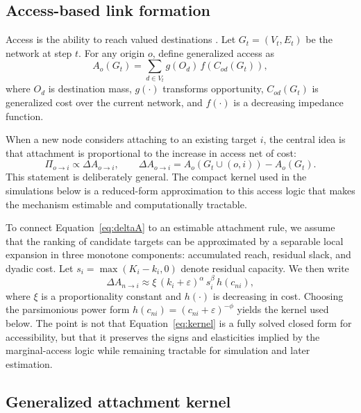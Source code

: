 \documentclass[11pt]{article}
\begin{document}
\subsection{Access-based link formation}

Access is the ability to reach valued destinations \citep{levinson2020towards}. Let $G_t=(V_t,E_t)$ be the network at step $t$. For any origin $o$, define generalized access as
\begin{equation}
A_o(G_t)=\sum_{d\in V_t} g(O_d)\,f(C_{od}(G_t)),
\label{eq:access}
\end{equation}
where $O_d$ is destination mass, $g(\cdot)$ transforms opportunity, $C_{od}(G_t)$ is generalized cost over the current network, and $f(\cdot)$ is a decreasing impedance function.

When a new node considers attaching to an existing target $i$, the central idea is that attachment is proportional to the increase in access net of cost:
\begin{equation}
\Pi_{o\to i} \propto \Delta A_{o\to i},
\qquad
\Delta A_{o\to i}=A_o(G_t\cup (o,i)) - A_o(G_t).
\label{eq:deltaA}
\end{equation}
This statement is deliberately general. The compact kernel used in the simulations below is a reduced-form approximation to this access logic that makes the mechanism estimable and computationally tractable.

To connect Equation~\ref{eq:deltaA} to an estimable attachment rule, we assume that the ranking of candidate targets can be approximated by a separable local expansion in three monotone components: accumulated reach, residual slack, and dyadic cost. Let $s_i=\max(K_i-k_i,0)$ denote residual capacity. We then write
\begin{equation}
\Delta A_{n\to i} \approx \xi\,(k_i+\varepsilon)^{\alpha}\,s_i^{\beta}\,h(c_{ni}),
\label{eq:deltaA-approx}
\end{equation}
where $\xi$ is a proportionality constant and $h(\cdot)$ is decreasing in cost. Choosing the parsimonious power form $h(c_{ni})=(c_{ni}+\varepsilon)^{-\phi}$ yields the kernel used below. The point is not that Equation~\ref{eq:kernel} is a fully solved closed form for accessibility, but that it preserves the signs and elasticities implied by the marginal-access logic while remaining tractable for simulation and later estimation.

\subsection{Generalized attachment kernel}
\end{document}
